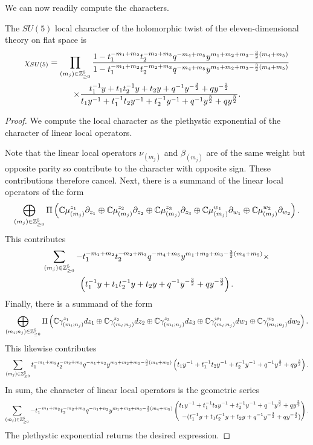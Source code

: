 We can now readily compute the characters.
\begin{prop}
The $SU(5)$ local character of the holomorphic twist of the eleven-dimensional theory on flat space is
\begin{multline}
\chi_{SU(5)} = 
\prod_ {(m_j)\in \mathbb{Z}^5_{\geq 0}} \frac{1- t_1^{-m_1+m_2}t_2^{-m_2+m_3}q^{-m_4+m_5}y^{m_1+m_2+m_3-\frac 3 2 (m_4+m_5)}}{1- t_1^{-m_1+m_2}t_2^{-m_2+m_3}q^{-m_4+m_5}y^{m_1+m_2+m_3-\frac 3 2 (m_4+m_5)} }
\\ 
\times \frac{t_1^{-1}y + t_1t_2^{-1}y + t_2y + q^{-1}y^{-\frac 3 2} + qy^{-\frac 3 2}}{t_1y^{-1} + t_1^{-1}t_2y^{-1} + t_2^{-1}y^{-1} + q^{-1}y^{\frac 3 2} + qy^{\frac 3 2}}.
\end{multline}
\end{prop}
\begin{proof}
We compute the local character as the plethystic exponential of the character of linear local operators. 

Note that the linear local operators $ \nu_{(m_j)}$ and $\beta_{(m_j)}$ are of the same weight but opposite parity so contribute to the character with opposite sign. These contributions therefore cancel. Next, there is a summand of the linear local operators of the form 
\[
\bigoplus _{(m_j)\in \mathbb{Z}^5_{\geq 0 }} \Pi \left ( \mathbb{C}\mu^{z_1}_{(m_j)}\partial_{z_1}\oplus \mathbb{C}\mu^{z_2}_{(m_j)}\partial_{z_2}\oplus \mathbb{C}\mu^{z_3}_{(m_j)}\partial_{z_3}\oplus\mathbb{C}\mu^{w_1}_{(m_j)}\partial_{w_1}\oplus \mathbb{C}\mu^{w_2}_{(m_j)}\partial_{w_2}\right).
\] 
This contributes 
\begin{multline}
\sum_{(m_j)\in \mathbb{Z}^5_{\geq 0 }}- t_1^{-m_1+m_2}t_2^{-m_2+m_3}q^{-m_4+m_5}y^{m_1+m_2+m_3-\frac 3 2 (m_4+m_5)} \times \\
\left (t_1^{-1}y + t_1t_2^{-1}y + t_2y + q^{-1}y^{-\frac 3 2} + qy^{-\frac 3 2} \right).
\end{multline}
Finally, there is a summand of the form 
\[
\bigoplus _{(m_i;n_j)\in \mathbb{Z}^5_{\geq 0 }} \Pi \left ( \mathbb{C}\gamma^{z_1}_{(m_i; n_j)}d{z_1}\oplus \mathbb{C}\gamma^{z_2}_{(m_i; n_j)}d{z_2}\oplus\mathbb{C}\gamma^{z_3}_{(m_i; n_j)}d{z_3}\oplus\mathbb{C}\gamma^{w_1}_{(m_i; n_j)}d{w_1}\oplus \mathbb{C}\gamma^{w_2}_{(m_i; n_j)}d {w_2}\right).
\] 
This likewise contributes 
\[
\sum_{(m_j)\in \mathbb{Z}^5_{\geq 0 }}t_1^{-m_1+m_2}t_2^{-m_2+m_3}q^{-n_1+n_2}y^{m_1+m_2+m_3-\frac 3 2 (m_4+m_5)}\left (t_1y^{-1} + t_1^{-1}t_2y^{-1} + t_2^{-1}y^{-1} + q^{-1}y^{\frac 3 2} + qy^{\frac 3 2} \right).
\] 
In sum, the character of linear local operators is the geometric series 
\[
\sum_{(m_j)\in \mathbb{Z}^5_{\geq 0 }}-t_1^{-m_1+m_2}t_2^{-m_2+m_3}q^{-n_1+n_2}y^{m_1+m_2+m_3-\frac 3 2 (m_4+m_5)}\left (\begin{aligned}t_1y^{-1} + t_1^{-1}t_2y^{-1} + t_2^{-1}y^{-1} + q^{-1}y^{\frac 3 2} + qy^{\frac 3 2} \\  - (t_1^{-1}y + t_1t_2^{-1}y + t_2y + q^{-1}y^{-\frac 3 2} + qy^{-\frac 3 2})\end{aligned}\right).
\] 
The plethystic exponential returns the desired expression.

\end{proof}
\fi

